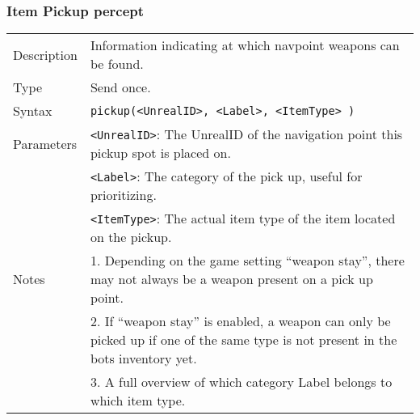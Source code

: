 \documentclass[11pt,a4paper]{article}
\begin{document}
\subsubsection*{Item Pickup percept}
\begin{small}
\begin{tabular}{p{2cm}p{9cm}}
Description & Information indicating at which navpoint weapons can be found.\\
Type & Send once.\\
Syntax & \verb|pickup(<UnrealID>, <Label>, <ItemType> )|\\
Parameters &
	\verb|<UnrealID>|: The UnrealID of the navigation point this pickup spot is placed on.\\
&	\verb|<Label>|: The category of the pick up, useful for prioritizing.\\
&	\verb|<ItemType>|: The actual item type of the item located on the pickup. \\
Notes & 
	1.	Depending on the game setting ``weapon stay'', there may not always be a weapon present on a pick up point. \\
&	2.	If ``weapon stay'' is enabled, a weapon can only be picked up if one of the same type is not present in the bots inventory yet.\\
&	3.	A full overview of which category Label belongs to which item type.
\end{tabular}
\end{small}
\\\\
\end{document}
